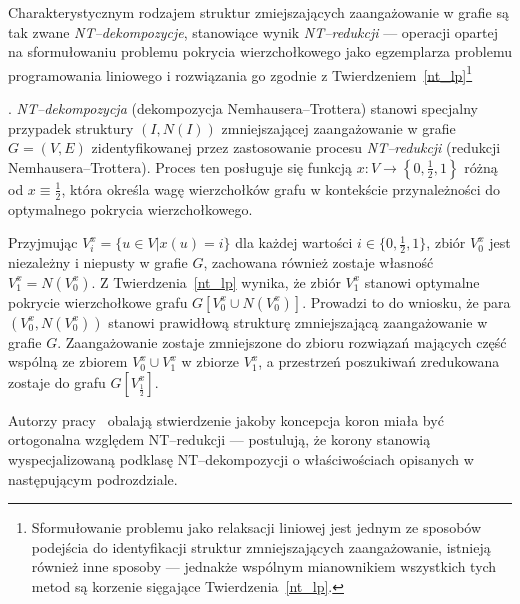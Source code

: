 \par{
  Charakterystycznym rodzajem struktur zmiejszających zaangażowanie w grafie są tak zwane \emph{NT--dekompozycje}, stanowiące wynik \emph{NT--redukcji} --- operacji opartej na sformułowaniu problemu pokrycia wierzchołkowego jako egzemplarza problemu programowania liniowego i rozwiązania go zgodnie z Twierdzeniem~\ref{nt_lp}\footnote{Sformułowanie problemu jako relaksacji liniowej jest jednym ze sposobów podejścia do identyfikacji struktur zmniejszających zaangażowanie, istnieją również inne sposoby --- jednakże wspólnym mianownikiem wszystkich tych metod są korzenie sięgające Twierdzenia~\ref{nt_lp}.}
  \begin{definition}.
    \emph{NT--dekompozycja} (dekompozycja Nemhausera--Trottera) stanowi specjalny przypadek struktury $(I, N(I))$ zmniejszającej zaangażowanie w grafie $G=(V, E)$ zidentyfikowanej przez zastosowanie procesu \emph{NT--redukcji} (redukcji Nemhausera--Trottera).
    Proces ten posługuje się funkcją $x: V \rightarrow \left\{0, \frac{1}{2}, 1\right\}$ różną od $x \equiv \frac{1}{2}$, która określa wagę wierzchołków grafu w kontekście przynależności do optymalnego pokrycia wierzchołkowego.
  \end{definition}
  Przyjmując $V_i^x=\{u \in V| x(u)=i\}$ dla każdej wartości $i\in \{0, \frac{1}{2}, 1\}$, zbiór $V_0^x$ jest niezależny i niepusty w grafie $G$, zachowana również zostaje własność $V_1^x = N(V_0^x)$.
  Z Twierdzenia~\ref{nt_lp} wynika, że zbiór $V_1^x$ stanowi optymalne pokrycie wierzchołkowe grafu $G[V_0^x \cup N(V_0^x)]$.
  Prowadzi to do wniosku, że para $(V_0^x, N(V_0^x))$ stanowi prawidłową strukturę zmniejszającą zaangażowanie w grafie $G$.
  Zaangażowanie zostaje zmniejszone do zbioru rozwiązań mających część wspólną ze zbiorem $V_0^x \cup V_1^x$ w zbiorze $V_1^x$, a przestrzeń poszukiwań zredukowana zostaje do grafu $G[V_\frac{1}{2}^x]$.
}
\par{
  Autorzy pracy~\cite{chlebik:crown} obalają stwierdzenie jakoby koncepcja koron miała być ortogonalna względem NT--redukcji --- postulują, że korony stanowią wyspecjalizowaną podklasę NT--dekompozycji o właściwościach opisanych w następującym podrozdziale.
}
